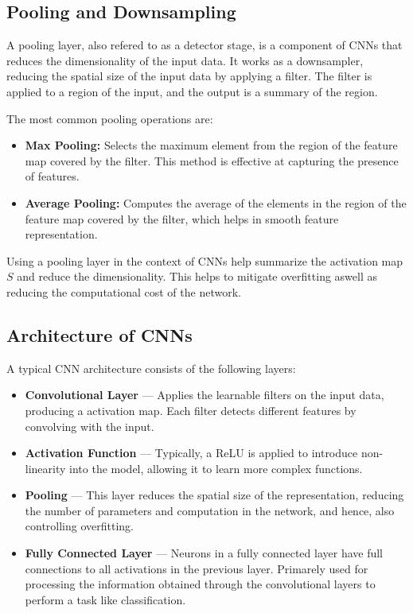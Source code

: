 \subsection{Pooling and Downsampling}
A pooling layer, also refered to as a detector stage, is a component of CNNs that reduces the dimensionality of the input data.
It works as a downsampler, reducing the spatial size of the input data by applying a filter. The filter is applied to a region of the input, and the output is a summary of the region.

The most common pooling operations are:
\begin{itemize}
    \item \textbf{Max Pooling:} Selects the maximum element from the region of the feature map covered by the filter. This method is effective at capturing the presence of features.
    \item \textbf{Average Pooling:} Computes the average of the elements in the region of the feature map covered by the filter, which helps in smooth feature representation.
\end{itemize}



Using a pooling layer in the context of CNNs help summarize the activation map $S$ and reduce the dimensionality. This helps to mitigate overfitting aswell as reducing the computational cost of the network.

\subsection{Architecture of CNNs}
A typical CNN architecture consists of the following layers:

\begin{itemize}
    \item \textbf{Convolutional Layer} — Applies the learnable filters on the input data, producing a activation map. Each filter detects different features by convolving with the input.
    \item \textbf{Activation Function} — Typically, a ReLU is applied to introduce non-linearity into the model, allowing it to learn more complex functions.
    \item \textbf{Pooling} — This layer reduces the spatial size of the representation, reducing the number of parameters and computation in the network, and hence, also controlling overfitting. 
    \item \textbf{Fully Connected Layer} — Neurons in a fully connected layer have full connections to all activations in the previous layer. Primarely used for processing the information obtained through the convolutional layers to perform a task like classification.
\end{itemize}



